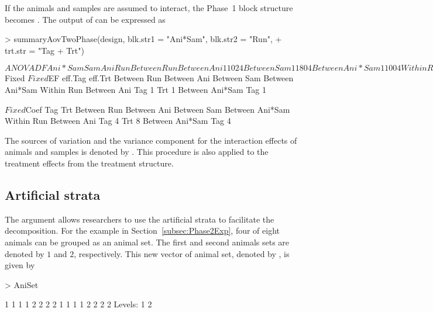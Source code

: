 \documentclass[article]{jss}
\begin{document}
If the animals and samples are assumed to interact, the Phase~1 block structure becomes . The output of  can be expressed as
\begin{CodeChunk}
\begin{CodeInput}
> summaryAovTwoPhase(design, blk.str1 = "Ani*Sam", blk.str2 = "Run", 
+ trt.str = "Tag + Trt")                                     
\end{CodeInput}
\begin{CodeOutput}
$ANOVA
                   DF Ani*Sam Sam Ani Run
Between Run                              
   Between Ani     1  1       0   2   4  
   Between Sam     1  1       8   0   4  
   Between Ani*Sam 1  1       0   0   4  
Within Run                               
   Between Ani                           
      Tag          1  1       0   2   0  
      Trt          1  1       0   2   0  
      Residual     4  1       0   2   0  
   Between Ani*Sam                       
      Tag          2  1       0   0   0  
      Residual     4  1       0   0   0  

$Fixed
$Fixed$EF
                   eff.Tag eff.Trt
Between Run                       
   Between Ani                    
   Between Sam                    
   Between Ani*Sam                
Within Run                        
   Between Ani                    
      Tag          1              
      Trt                  1      
   Between Ani*Sam                
      Tag          1              

$Fixed$Coef
                   Tag Trt
Between Run               
   Between Ani            
   Between Sam            
   Between Ani*Sam        
Within Run                
   Between Ani            
      Tag          4      
      Trt              8  
   Between Ani*Sam        
      Tag          4              
\end{CodeOutput}
\end{CodeChunk}
The sources of variation and the variance component for the interaction effects of animals and samples is denoted by . This procedure is also applied to the treatment effects from the treatment structure. 

\subsection{Artificial strata}
The  argument allows researchers to use the artificial strata to facilitate the decomposition. For the example in Section~\ref{subsec:Phase2Exp}, four of eight animals can be grouped as an animal set. The first and second animals sets are denoted by $1$ and $2$, respectively. This new vector of animal set, denoted by , is given by
\begin{CodeChunk}
\begin{CodeInput}
> AniSet
\end{CodeInput}
\begin{CodeOutput}
 [1] 1 1 1 1 2 2 2 2 1 1 1 1 2 2 2 2
Levels: 1 2
\end{CodeOutput}
\end{CodeChunk}
\end{document}
